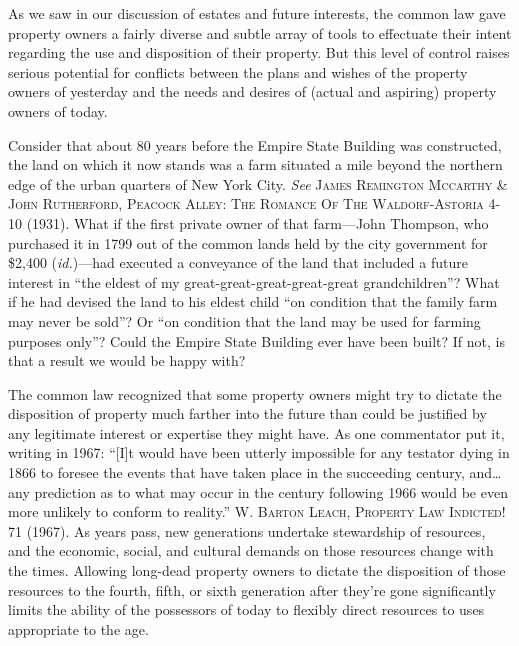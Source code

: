 As we saw in our discussion of estates and future interests, the common law gave
property owners a fairly diverse and subtle array of tools to effectuate their
intent regarding the use and disposition of their property. But this level of
control raises serious potential for conflicts between the plans and wishes of
the property owners of yesterday and the needs and desires of (actual and
aspiring) property owners of today.

Consider that about 80 years before the Empire State Building was constructed,
the land on which it now stands was a farm situated a mile beyond the northern
edge of the urban quarters of New York City. \textit{See} \textsc{James
Remington Mccarthy \& John Rutherford, Peacock Alley: The Romance Of The
Waldorf-Astoria} 4-10 (1931). What if the first private owner of that
farm---John Thompson, who purchased it in 1799 out of the common lands held by
the city government for \$2,400 (\textit{id.})---had executed a conveyance of
the land that included a future interest in ``the eldest of my
great-great-great-great-great grandchildren''? What if he had devised the land
to his eldest child ``on condition that the family farm may never be sold''? Or
``on condition that the land may be used for farming purposes only''? Could the
Empire State Building ever have been built? If not, is that a result we would
be happy with?

The common law recognized that some property owners might try to dictate the
disposition of property much farther into the future than could be justified by
any legitimate interest or expertise they might have. As one commentator put
it, writing in 1967: ``[I]t would have been utterly impossible for any testator
dying in 1866 to foresee the events that have taken place in the succeeding
century, and\ldots any prediction as to what may occur in the century following
1966 would be even more unlikely to conform to reality.'' \textsc{W. Barton
Leach, Property Law Indicted!} 71 (1967). As years pass, new generations
undertake stewardship of resources, and the economic, social, and cultural
demands on those resources change with the times. Allowing long-dead property
owners to dictate the disposition of those resources to the fourth, fifth, or
sixth generation after they're gone significantly limits the ability of the
possessors of today to flexibly direct resources to uses appropriate to the
age. 

